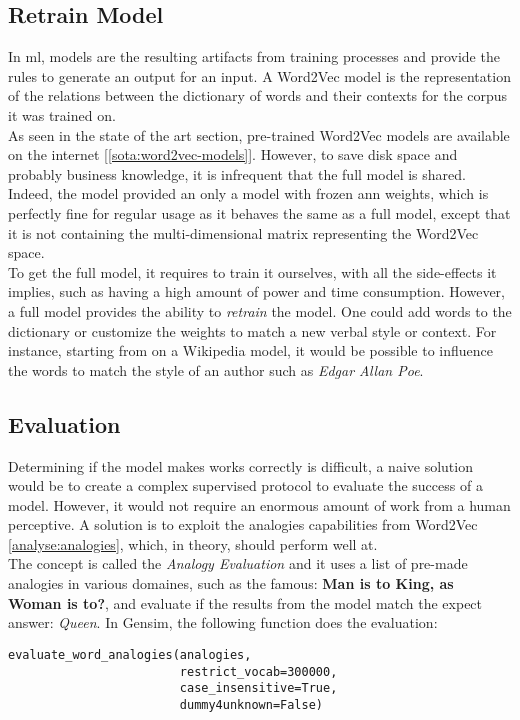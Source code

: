 \subsection{Retrain Model}
\label{analyse:retrain}
In \gls{ml}, models are the resulting artifacts from training processes and provide the rules to generate an output for an input. A Word2Vec model is the representation of the relations between the dictionary of words and their contexts for the corpus it was trained on.\\

As seen in the state of the art section, pre-trained Word2Vec models are available on the internet [\ref{sota:word2vec-models}]. However, to save disk space and probably business knowledge, it is infrequent that the full model is shared. Indeed, the model provided an only a model with frozen \gls{ann} weights, which is perfectly fine for regular usage as it behaves the same as a full model, except that it is not containing the multi-dimensional matrix representing the Word2Vec space.\\

To get the full model, it requires to train it ourselves, with all the side-effects it implies, such as having a high amount of power and time consumption. However, a full model provides the ability to \textit{retrain} the model. One could add words to the dictionary or customize the weights to match a new verbal style or context. For instance, starting from on a Wikipedia model, it would be possible to influence the words to match the style of an author such as \textit{Edgar Allan Poe}.


\subsection{Evaluation}
\label{analyse:evaluation}
Determining if the model makes works correctly is difficult, a naive solution would be to create a complex supervised protocol to evaluate the success of a model. However, it would not require an enormous amount of work from a human perceptive. A solution is to exploit the analogies capabilities from Word2Vec \ref{analyse:analogies}, which, in theory, should perform well at.\\

The concept is called the \textit{Analogy Evaluation} and it uses a list of pre-made analogies in various domaines, such as the famous: \textbf{Man is to King, as Woman is to?}, and evaluate if the results from the model match the expect answer: \textit{Queen}. In Gensim, the following function does the evaluation: 
\begin{lstlisting}
evaluate_word_analogies(analogies,
                        restrict_vocab=300000,
                        case_insensitive=True,
                        dummy4unknown=False)
\end{lstlisting}
\vspace{1em}

